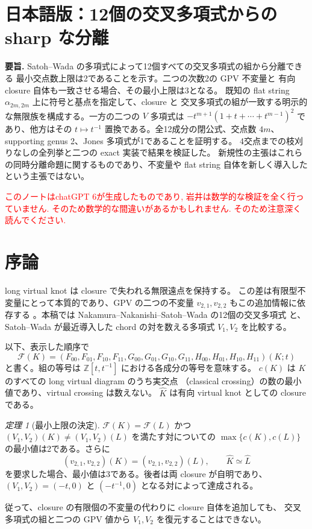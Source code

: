 \documentclass[12pt]{amsart}
\theoremstyle{definition}
\theoremstyle{remark}
\numberwithin{equation}{section}
\newcommand{\Z}{\mathbb{Z}}
\newcommand{\xr}[1]{\textcolor{red}{#1}}
\newcommand{\Package}{\mathcal F}
\newcommand{\clK}[1]{\widehat{#1}}
\begin{document}
\newpage
\section*{日本語版：12個の交叉多項式からの sharp な分離}
\setcounter{section}{0}
\renewcommand{\theHsection}{ja.\arabic{section}}
\renewcommand{\proofname}{証明}
\newtheorem{jthm}[thm]{定理}
\newtheorem{jlem}[thm]{補題}

\noindent\textbf{要旨.}
Satoh--Wada の多項式によって12個すべての交叉多項式の組から分離できる
最小交点数上限は2であることを示す。二つの次数2の GPV 不変量と
有向 closure 自体も一致させる場合、その最小上限は3となる。
既知の flat string $\alpha_{2m,2m}$ 上に符号と基点を指定して、closure と
交叉多項式の組が一致する明示的な無限族を構成する。一方の二つの
$V$ 多項式は $-t^{m+1}(1+t+\cdots+t^{m-1})^2$ であり、他方はその
$t\mapsto t^{-1}$ 置換である。全12成分の閉公式、交点数 $4m$、
supporting genus 2、Jones 多項式が1であることを証明する。
4交点までの枝刈りなしの全列挙と二つの exact 実装で結果を検証した。
新規性の主張はこれらの同時分離命題に関するものであり、不変量や
flat string 自体を新しく導入したという主張ではない。

\xr{このノートはchatGPT 6が生成したものであり, 岩井は数学的な検証を全く行っていません. そのため数学的な間違いがあるかもしれません. そのため注意深く読んでください.}
\section{序論}
long virtual knot は closure で失われる無限遠点を保持する。
この差は有限型不変量にとって本質的であり、GPV の二つの不変量
$v_{2,1},v_{2,2}$ もこの追加情報に依存する
\cite[\S\S1.6,3.2]{GPV}。本稿では
Nakamura--Nakanishi--Satoh--Wada の12個の交叉多項式
\cite{NNSW1,NNSW2} と、Satoh--Wada が最近導入した
chord の対を数える多項式 $V_1,V_2$ \cite{SW} を比較する。

以下、表示した順序で
\begin{equation}\label{ja:package}
\Package(K)=(F_{00},F_{01},F_{10},F_{11},
G_{00},G_{01},G_{10},G_{11},H_{00},H_{01},H_{10},H_{11})(K;t)
\end{equation}
と書く。組の等号は $\Z[t,t^{-1}]$ における各成分の等号を意味する。
$c(K)$ は $K$ のすべての long virtual diagram のうち実交点
（classical crossing）の数の最小値であり、virtual crossing は数えない。
$\clK K$ は有向 virtual knot としての closure である。

\begin{jthm}[最小上限の決定]\label{ja:minthm}
$\Package(K)=\Package(L)$ かつ
$(V_1,V_2)(K)\ne(V_1,V_2)(L)$ を満たす対についての
$\max\{c(K),c(L)\}$ の最小値は2である。さらに
\[
(v_{2,1},v_{2,2})(K)=(v_{2,1},v_{2,2})(L),\qquad
\clK K\simeq\clK L
\]
を要求した場合、最小値は3である。後者は両 closure が自明であり、
$(V_1,V_2)=(-t,0)$ と $(-t^{-1},0)$ となる対によって達成される。
\end{jthm}
従って、closure の有限個の不変量の代わりに closure 自体を追加しても、
交叉多項式の組と二つの GPV 値から $V_1,V_2$ を復元することはできない。
\end{document}
